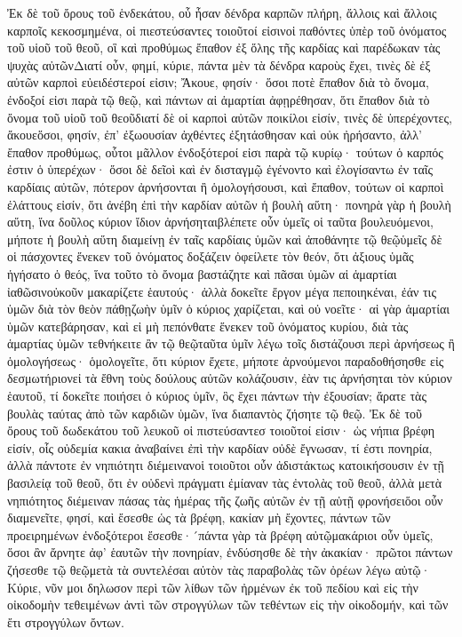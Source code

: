 Ἐκ δὲ τοῦ ὄρους τοῦ ἑνδεκάτου, οὗ ἦσαν δένδρα καρπῶν πλήρη, ἄλλοις καὶ ἄλλοις καρποῖς κεκοσμημένα, οἱ πιεστεύσαντες τοιοῦτοί εἰσινοἱ παθόντες ὑπὲρ τοῦ ὀνόματος τοῦ υἱοῦ τοῦ θεοῦ, οἳ καὶ προθύμως ἔπαθον ἐξ ὅλης τῆς καρδίας καὶ παρέδωκαν τὰς ψυχὰς αὐτῶνΔιατί οὖν, φημί, κύριε, πάντα μὲν τὰ δένδρα καροὺς ἔχει, τινὲς δὲ ἐξ αὐτῶν καρποὶ εὐειδέστεροί εἰσιν; Ἄκουε, φησίν· ὅσοι ποτὲ ἔπαθον διὰ τὸ ὄνομα, ἐνδοξοί εἰσι παρὰ τῷ θεῷ, καὶ πάντων αἱ ἁμαρτίαι ἀφῃρέθησαν, ὅτι ἔπαθον διὰ τὸ ὄνομα τοῦ υἱοῦ τοῦ θεοῦδιατί δὲ οἱ καρποὶ αὐτῶν ποικίλοι εἰσίν, τινὲς δὲ ὑπερέχοντες, ἄκουεὅσοι, φησίν, ἐπ’ ἐξωουσίαν ἀχθέντες ἐξητάσθησαν καὶ οὐκ ἠρήσαντο, ἀλλ’ ἔπαθον προθύμως, οὗτοι μᾶλλον ἐνδοξότεροί εἰσι παρὰ τῷ κυρίῳ· τούτων ὁ καρπός ἐστιν ὁ ὑπερέχων· ὅσοι δὲ δεῖοὶ καὶ ἐν δισταγμῷ ἐγένοντο καὶ ἐλογίσαντω ἐν ταῖς καρδίαις αὐτῶν, πότερον ἀρνήσονται ἢ ὁμολογήσουσι, καὶ ἔπαθον, τούτων οἱ καρποὶ ἐλάττους εἰσίν, ὅτι ἀνέβη ἐπὶ τὴν καρδίαν αὐτῶν ἡ βουλὴ αὕτη· πονηρὰ γὰρ ἡ βουλὴ αὕτη, ἵνα δοῦλος κύριον ἴδιον ἀρνήσηταιβλέπετε οὖν ὑμεῖς οἱ ταῦτα βουλευόμενοι, μήποτε ἡ βουλὴ αὕτη διαμείνῃ ἐν ταῖς καρδίαις ὑμῶν καὶ ἀποθάνητε τῷ θεῷὑμεῖς δὲ οἱ πάσχοντες ἕνεκεν τοῦ ὀνόματος δοξάζειν ὀφείλετε τὸν θεόν, ὅτι ἀξιους ὑμᾶς ἡγήσατο ὁ θεός, ἵνα τοῦτο τὸ ὄνομα βαστάζητε καὶ πᾶσαι ὑμῶν αἱ ἁμαρτίαι ἰαθῶσινοὐκοῦν μακαρίζετε ἑαυτούς· ἀλλὰ δοκεῖτε ἔργον μέγα πεποιηκέναι, ἐάν τις ὑμῶν διὰ τὸν θεὸν πάθῃζωὴν ὑμῖν ὁ κύριος χαρίζεται, καὶ οὐ νοεῖτε· αἱ γὰρ ἁμαρτίαι ὑμῶν κατεβάρησαν, καὶ εἰ μὴ πεπόνθατε ἕνεκεν τοῦ ὀνόματος κυρίου, διὰ τὰς ἁμαρτίας ὑμῶν τεθνήκειτε ἂν τῷ θεῷταῦτα ὑμῖν λέγω τοῖς διστάζουσι περὶ ἀρνήσεως ἢ ὁμολογήσεως· ὁμολογεῖτε, ὅτι κύριον ἔχετε, μήποτε ἀρνούμενοι παραδοθήσησθε εἰς δεσμωτήριονεἰ τὰ ἔθνη τοὺς δούλους αὐτῶν κολάζουσιν, ἐὰν τις ἀρνήσηται τὸν κύριον ἑαυτοῦ, τί δοκεῖτε ποιήσει ὁ κύριος ὑμῖν, ὃς ἔχει πάντων τὴν ἐξουσίαν; ἄρατε τὰς βουλὰς ταύτας ἀπὸ τῶν καρδιῶν ὑμῶν, ἵνα διαπαντὸς ζήσητε τῷ θεῷ.
Ἐκ δὲ τοῦ ὄρους τοῦ δωδεκάτου τοῦ λευκοῦ οἱ πιστεύσαντεσ τοιοῦτοί εἰσιν· ὡς νήπια βρέφη εἰσίν, οἷς οὐδεμία κακια ἀναβαίνει ἐπὶ τὴν καρδίαν οὐδὲ ἔγνωσαν, τί ἐστι πονηρία, ἀλλὰ πάντοτε ἐν νηπιότητι διέμεινανοἱ τοιοῦτοι οὖν ἀδιστάκτως κατοικήσουσιν ἐν τῇ βασιλείᾳ τοῦ θεοῦ, ὅτι ἐν οὐδενὶ πράγματι ἐμίαναν τὰς ἐντολὰς τοῦ θεοῦ, ἀλλὰ μετὰ νηπιότητος διέμειναν πάσας τὰς ἡμέρας τῆς ζωῆς αὐτῶν ἐν τῇ αὑτῇ φρονήσειὅοι οὖν διαμενεῖτε, φησί, καὶ ἔσεσθε ὡς τὰ βρέφη, κακίαν μὴ ἔχοντες, πάντων τῶν προειρημένων ἐνδοξότεροι ἔσεσθε·´πάντα γὰρ τὰ βρέφη αὐτῷμακάριοι οὖν ὑμεῖς, ὅσοι ἂν ἄρνητε ἀφ’ ἑαυτῶν τὴν πονηρίαν, ἐνδύσησθε δὲ τὴν ἀκακίαν· πρῶτοι πάντων ζήσεσθε τῷ θεῷμετὰ τὰ συντελέσαι αὐτὸν τὰς παραβολὰς τῶν ὀρέων λέγω αὐτῷ· Κύριε, νῦν μοι δηλωσον περὶ τῶν λίθων τῶν ἠρμένων ἐκ τοῦ πεδίου καὶ εἰς τὴν οἰκοδομὴν τεθειμένων ἀντὶ τῶν στρογγύλων τῶν τεθέντων εἰς τὴν οἰκοδομήν, καὶ τῶν ἔτι στρογγύλων ὄντων.
